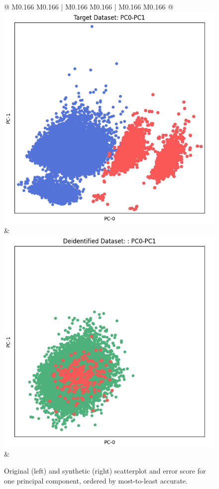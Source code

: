 \begin{figure}[p!]
\begin{tabular}{@{} M{0.166\textwidth} M{0.166\textwidth} | M{0.166\textwidth} M{0.166\textwidth} | M{0.166\textwidth} M{0.166\textwidth} @{}}
       \includegraphics[width=\linewidth]{z_Pategan.orig.png} &
       \includegraphics[width=\linewidth]{z_Pategan.syn.png} \\ 
 &
 \\ 
    \end{tabular}
\caption{Original (left) and synthetic (right) scatterplot and error score for one principal component, ordered by most-to-least accurate.}
\label{fig:pca_grid}
\end{figure}